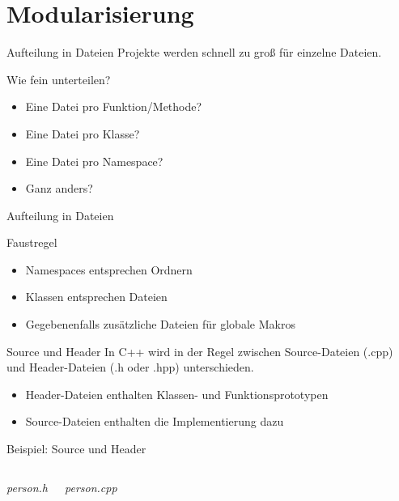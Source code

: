 \section{Modularisierung}

\begin{frame}[fragile]{Aufteilung in Dateien}
	Projekte werden schnell zu groß für einzelne Dateien.
	
	\begin{block}{Wie fein unterteilen?}
		\begin{itemize}
			\item Eine Datei pro Funktion/Methode?
			\item Eine Datei pro Klasse?
			\item Eine Datei pro Namespace?
			\item Ganz anders?
		\end{itemize}
	\end{block}
\end{frame}

\begin{frame}[fragile]{Aufteilung in Dateien}
	\begin{block}{Faustregel}
		\begin{itemize}
			\item Namespaces entsprechen Ordnern
			\item Klassen entsprechen Dateien
			\item Gegebenenfalls zusätzliche Dateien für globale Makros
		\end{itemize}
	\end{block}
\end{frame}

\begin{frame}[fragile]{Source und Header}
	In C++ wird in der Regel zwischen Source-Dateien (.cpp) und Header-Dateien (.h oder .hpp) unterschieden.
	
	\begin{itemize}
		\item Header-Dateien enthalten Klassen- und Funktionsprototypen
		\item Source-Dateien enthalten die Implementierung dazu
	\end{itemize}
\end{frame}

\begin{frame}[fragile]{Beispiel: Source und Header}
	\footnotesize
	
	
	\begin{columns}
		\emph{person.h}
		\vspace{0.5em}
		
		
		\emph{person.cpp}
		\vspace{0.5em}
		
	\end{columns}
\end{frame}


